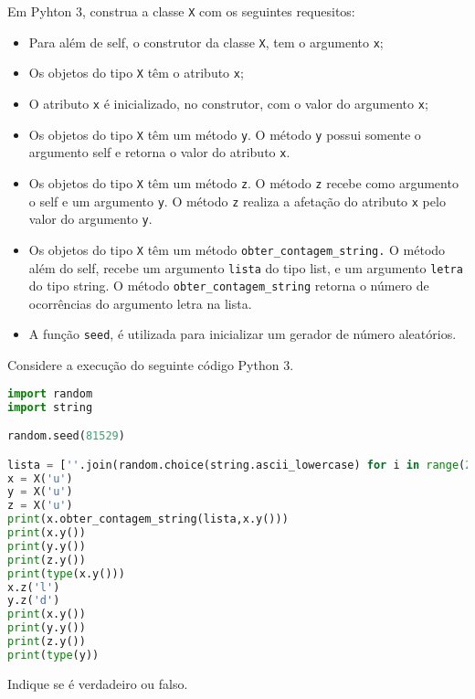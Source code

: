 \documentclass[12pt,varwidth=16cm,border=17pt]{standalone}
\begin{document}
Em Pyhton 3, construa a classe \verb+X+ com os seguintes requesitos:

\begin{itemize}

  \item Para além de self, o construtor da classe \verb+X+, tem o argumento \verb+x+;
  \item Os objetos do tipo \verb+X+ têm o atributo \verb+x+;
  \item O atributo \verb+x+ é inicializado, no construtor, com o valor
	do argumento \verb+x+;
  \item Os objetos do tipo \verb+X+ têm um método \verb+y+. O
    método \verb+y+ possui somente o argumento self e retorna o valor do atributo \verb+x+.
	
  \item Os objetos do tipo \verb+X+ têm um método \verb+z+. O
    método \verb+z+ recebe como argumento o self e um argumento \verb+y+. 
	O método \verb+z+ realiza a afetação do atributo \verb+x+ pelo valor do argumento \verb+y+.
    
 \item Os objetos do tipo \verb+X+ têm um método \verb+obter_contagem_string.+ O
    método além do self, recebe um argumento \verb+lista+ do tipo list, e um argumento \verb+letra+ do tipo string. O método \verb+obter_contagem_string+ retorna o número de ocorrências do argumento letra na lista.
    
 \item A função \verb+seed+, é utilizada para inicializar um gerador de número aleatórios.
    
\end{itemize}

Considere a execução do seguinte código Python 3.






\begin{lstlisting}[language=Python]
import random
import string

random.seed(81529)

lista = [''.join(random.choice(string.ascii_lowercase) for i in range(2)) for i in range(300)]
x = X('u')
y = X('u')
z = X('u')
print(x.obter_contagem_string(lista,x.y()))
print(x.y())
print(y.y())
print(z.y())
print(type(x.y()))
x.z('l')
y.z('d')
print(x.y())
print(y.y())
print(z.y())
print(type(y))
\end{lstlisting}

Indique se é verdadeiro ou falso.
\end{document}
